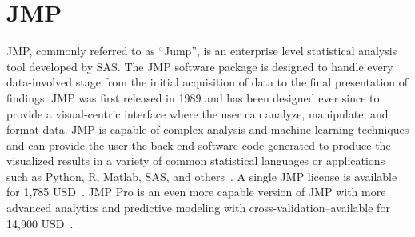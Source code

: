 \section{JMP}

JMP, commonly referred to as ``Jump'', is an enterprise level
statistical analysis tool developed by SAS. The JMP software package
is designed to handle every data-involved stage from the initial
acquisition of data to the final presentation of findings. JMP was
first released in 1989 and has been designed ever since to provide a
visual-centric interface where the user can analyze, manipulate, and
format data. JMP is capable of complex analysis and machine learning
techniques and can provide the user the back-end software code
generated to produce the visualized results in a variety of common
statistical languages or applications such as Python, R, Matlab, SAS,
and others~\cite{hid-sp18-507-JMP9}. A single JMP license is available
for 1,785 USD~\cite{hid-sp18-507-JMPSAS}. JMP Pro is an even more
capable version of JMP with more advanced analytics and predictive
modeling with cross-validation--available for 14,900
USD~\cite{hid-sp18-507-JMPPro}.
